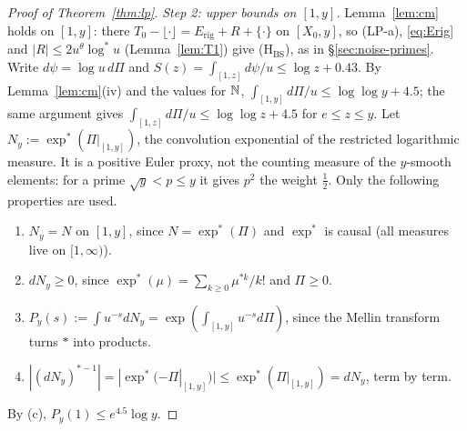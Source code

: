 \begin{proof}[Proof of Theorem~\ref{thm:lp}]
\emph{Step 2: upper bounds on $[1,y]$.} Lemma~\ref{lem:cm} holds on $[1,y]$: there $T_0-\lfloor\cdot\rfloor=E_{\mathrm{rig}}+R+\{\cdot\}$ on
$[X_0,y]$, so (LP-a), \eqref{eq:Erig} and $|R|\le2u^\theta\log^*u$ (Lemma~\ref{lem:T1}) give \textup{(H$_{\mathrm{BS}}$)}, as in
\S\ref{sec:noise-primes}. Write $d\psi=\log u\,d\Pi$ and
$S(z)=\int_{[1,z]}d\psi/u\le\log z+0.43$. By Lemma~\ref{lem:cm}(iv) and the values for $\mathbb{N}$,
$\int_{[1,y]}d\Pi/u\le\log\log y+4.5$; the same argument gives $\int_{[1,z]}d\Pi/u\le\log\log z+4.5$ for $e\le z\le y$.
Let $N_y:=\exp^*(\Pi|_{[1,y]})$, the convolution exponential of the restricted logarithmic measure. It is a positive Euler
proxy, not the counting measure of the $y$-smooth elements: for a prime $\sqrt y<p\le y$ it gives $p^2$ the weight
$\frac12$. Only the following properties are used.
\begin{enumerate}[label=(\alph*)]
\item $N_y=N$ on $[1,y]$, since $N=\exp^*(\Pi)$ and $\exp^*$ is causal (all measures live on $[1,\infty)$).
\item $dN_y\ge0$, since $\exp^*(\mu)=\sum_{k\ge0}\mu^{*k}/k!$ and $\Pi\ge0$.
\item $P_y(s):=\int u^{-s}dN_y=\exp(\int_{[1,y]}u^{-s}d\Pi)$, since the Mellin transform turns $*$ into products.
\item $|(dN_y)^{*-1}|=|\exp^*(-\Pi|_{[1,y]})|\le\exp^*(\Pi|_{[1,y]})=dN_y$, term by term.
\end{enumerate}
By (c), $P_y(1)\le e^{4.5}\log y$.


\end{proof}
